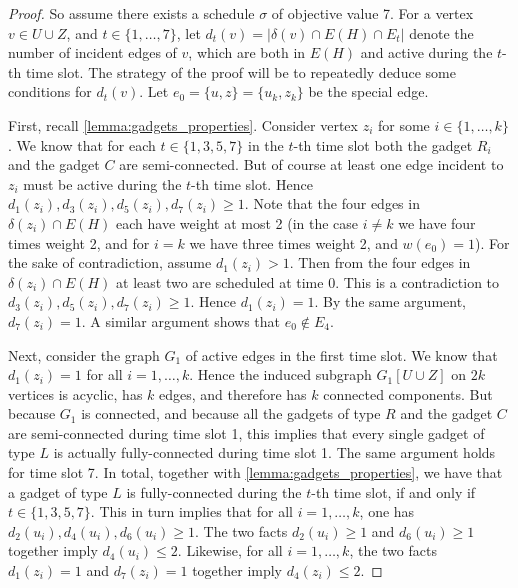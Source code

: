 \documentclass[runningheads]{llncs}
\newcommand{\set}[1]{\{ #1 \}}
\newcommand{\fromto}[2]{\set{#1, \ldots, #2}}
\begin{document}
\begin{proof}
So assume there exists a schedule $\sigma$ of objective value 7. 
For a vertex $v \in U \cup Z$, and $t \in \fromto{1}{7}$, let $d_t(v) = |\delta(v) \cap E(H) \cap E_t|$ denote the number of incident edges of $v$, which are both in $E(H)$ and active during the $t$-th time slot. The strategy of the proof will be to repeatedly deduce some conditions for $d_t(v)$. 
Let $e_0 = \set{u, z} = \set{u_k, z_k}$ be the special edge.

First, recall \cref{lemma:gadgets_properties}. Consider vertex $z_i$ for some $i \in \fromto{1}{k}$. We know that for each $t \in \set{1, 3, 5, 7}$ in the $t$-th time slot both the gadget $R_i$ and the gadget $C$ are semi-connected. But of course at least one edge incident to $z_i$ must be active during the $t$-th time slot. Hence $d_1(z_i), d_3(z_i), d_5(z_i), d_7(z_i) \geq 1$.  Note that the four edges in $\delta(z_i) \cap E(H)$ each have weight at most 2 (in the case $i \neq k$ we have four times weight 2, and for $i = k$ we have three times weight 2, and $w(e_0) = 1$). For the sake of contradiction, assume $d_1(z_i) > 1$. Then from the four edges in $\delta(z_i) \cap E(H)$ at least two are scheduled at time $0$. This is a contradiction to  $d_3(z_i), d_5(z_i), d_7(z_i) \geq 1$. Hence $d_1(z_i) = 1$. By the same argument, $d_7(z_i) = 1$. A similar argument shows that $e_0 \not\in E_4$.

Next, consider the graph $G_1$ of active edges in the first time slot. We know that  $d_1(z_i) = 1$ for all $i= 1,\dots, k$. Hence the induced subgraph $G_1[U \cup Z]$ on $2k$ vertices is acyclic, has $k$ edges, and therefore has $k$ connected components. But because $G_1$ is connected, and because all the gadgets of type $R$ and the gadget $C$ are semi-connected during time slot 1, this implies that every single gadget of type $L$ is actually fully-connected during time slot 1. The same argument holds for time slot 7. In total, together with \cref{lemma:gadgets_properties}, we have that a gadget of type $L$ is fully-connected during the $t$-th time slot, if and only if $t \in \set{1, 3, 5, 7}$. This in turn implies that for all $i = 1,\dots, k$, one has $d_2(u_i), d_4(u_i), d_6(u_i) \geq 1$. The two facts $d_2(u_i) \geq 1$ and $d_6(u_i) \geq 1$ together imply $d_4(u_i) \leq 2$. Likewise, for all $i = 1,\dots,k$, the two facts $d_1(z_i) = 1$ and $d_7(z_i) = 1$ together imply $d_4(z_i) \leq 2$.


\end{proof}
\end{document}
